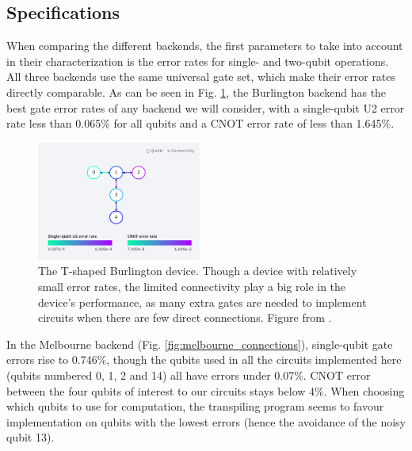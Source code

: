 \subsection{Specifications}\label{Specifications} When comparing the different backends, the first
parameters to take into account in their characterization is the error rates for
single- and two-qubit operations. All three backends use the same universal gate
set, which make their error rates directly comparable. As can be seen in Fig.
\ref{fig:burlington_connections}, the Burlington backend has the best gate error rates of
any backend we will consider, with a single-qubit U2 error rate less than
0.065\% for all qubits and a CNOT error rate of less than 1.645\%.

\begin{figure}[h] \centering
\includegraphics[width=0.48\textwidth]{images/connection_diagram_burlington.png}
  \caption{The T-shaped Burlington device. Though a device with relatively small
error rates, the limited connectivity play a big role in the device's
performance, as many extra gates are needed to implement circuits when there are
few direct connections. Figure from \cite{ibmq_burlington}.}
  \label{fig:burlington_connections}
\end{figure}

In the Melbourne backend (Fig. \ref{fig:melbourne_connections}), single-qubit
gate errors rise to 0.746\%, though the qubits used in all the circuits
implemented here (qubits numbered 0, 1, 2 and 14) all have errors under 0.07\%.
CNOT error between the four qubits of interest to our circuits stays below 4\%.
When choosing which qubits to use for computation, the transpiling program seems
to favour implementation on qubits with the lowest errors (hence the avoidance
of the noisy qubit 13).

